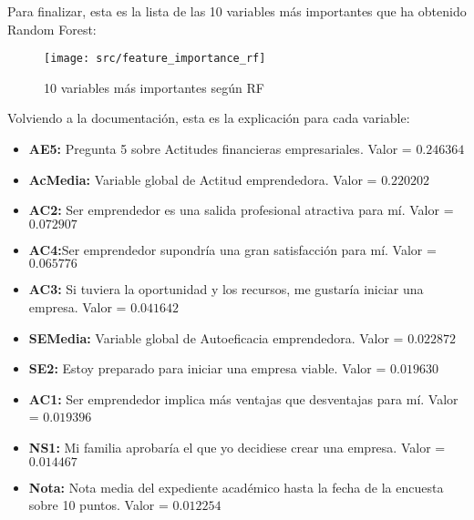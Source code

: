 Para finalizar, esta es la lista de las 10 variables más importantes que ha obtenido Random Forest:
\begin{figure}[H]
	\centering
	\texttt{[image: src/feature\_importance\_rf]}
	\caption{10 variables más importantes según RF}
	\label{fig:feature_rf}
\end{figure}
Volviendo a la documentación, esta es la explicación para cada variable:
\begin{itemize}
	\item\textbf{AE5:} Pregunta  5 sobre Actitudes financieras empresariales. Valor = $0.246364$
	\item\textbf{AcMedia:} Variable global de Actitud emprendedora. Valor = $0.220202$
	\item\textbf{AC2:} Ser emprendedor es una salida profesional atractiva para mí. Valor = $0.072907$
	\item\textbf{AC4:}Ser emprendedor supondría una gran satisfacción para mí. Valor = $0.065776$
	\item\textbf{AC3:} Si tuviera la oportunidad y los recursos, me gustaría iniciar una empresa. Valor = $0.041642$
	\item\textbf{SEMedia:} Variable global de Autoeficacia emprendedora. Valor = $0.022872$
	\item\textbf{SE2:} Estoy preparado para iniciar una empresa viable. Valor = $0.019630$
	\item\textbf{AC1:} Ser emprendedor implica más ventajas que desventajas para mí. Valor = $0.019396$
	\item\textbf{NS1:} Mi familia aprobaría el que yo decidiese crear una empresa. Valor = $0.014467$
	\item\textbf{Nota:} Nota media del expediente académico hasta la fecha de la encuesta sobre 10 puntos. Valor = $0.012254$
\end{itemize}
